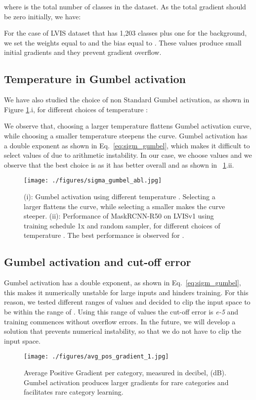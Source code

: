\documentclass[runningheads]{llncs}
\begin{document}
where  is the total number of classes in the dataset. As the total gradient should be zero initially, we have:

For the case of LVIS dataset that has 1,203 classes plus one for the background, we set the weights  equal to  and the bias equal to . These values produce small initial gradients and they prevent gradient overflow.

\subsection{Temperature in Gumbel activation}
We have also studied the choice of non Standard Gumbel activation, as shown in Figure \ref{fig:sigma_gumbel}.i, for different choices of temperature :

We observe that, choosing a larger temperature flattens Gumbel activation curve, while choosing a smaller temperature steepens the curve.
Gumbel activation has a double exponent as shown in Eq.~\ref{eq:sigm_gumbel}, which makes it difficult to select values of  due to arithmetic instability. In our case, we choose values  and we observe that the best choice is   as it has better overall  and  as shown in ~\ref{fig:sigma_gumbel}.ii.

\begin{figure}[t]
    \centering
    \texttt{[image: ./figures/sigma\_gumbel\_abl.jpg]}
    \caption{(i): Gumbel activation using different temperature . Selecting a larger  flattens the curve, while selecting a smaller  makes the curve steeper. (ii): Performance of MaskRCNN-R50 on LVISv1 using training schedule 1x and random sampler, for different choices of temperature . The best performance is observed for .}
    \label{fig:sigma_gumbel}
\end{figure}


\subsection{Gumbel activation and cut-off error}
Gumbel activation has a double exponent, as shown in Eq.~\ref{eq:sigm_gumbel}, this makes it numerically unstable for large inputs and hinders training. For this reason, we tested different ranges of values and decided to clip the input space to be within the range of . Using this range of values the cut-off error is \textit{e-5} and training commences without overflow errors. In the future, we will develop a solution that prevents numerical instability, so that we do not have to clip the input space.
\begin{figure}[t]
    \centering
    \texttt{[image: ./figures/avg\_pos\_gradient\_1.jpg]}
    \caption{Average Positive Gradient  per category, measured in decibel, (dB). Gumbel activation produces larger gradients for rare categories and facilitates rare category learning.}
    \label{fig:avg_pos_grad}
\end{figure}
\end{document}
